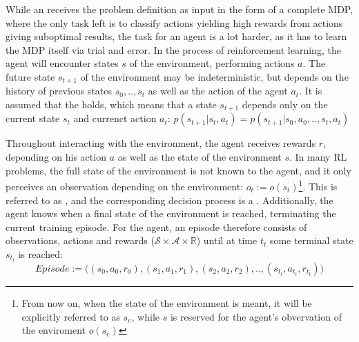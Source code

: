 \noindent While an  receives the problem definition as input in the form of a complete MDP, where the only task left is to classify actions yielding high rewards from actions giving suboptimal results, the task for an  agent is a lot harder, as it has to learn the MDP itself via trial and error. In the process of reinforcement learning, the agent will encounter states $s$ of the environment, performing actions $a$. The future state $s_{t+1}$ of the environment may be indeterministic, but depends on the history of previous states $s_0, .., s_t$ as well as the action of the agent $a_t$. It is assumed that the  holds, which means that a state  $s_{t+1}$ depends only on the current state $s_t$ and currenct action $a_t$: $p(s_{t+1}|s_t,a_t) = p(s_{t+1}|s_0,a_0,..,s_t,a_t)$

Throughout interacting with the environment, the agent receives rewards $r$, depending on his action $a$ as well as the state of the environment $s$. In many RL problems, the full state of the environment is not known to the agent, and it only perceives an observation depending on the environment: $o_t := o(s_t)$\footnote{From now on, when the state of the environment is meant, it will be explicitly referred to as $s_e$, while $s$ is reserved for the agent's obvervation of the enviroment $o(s_e)$}. This is referred to as , and the corresponding decision process is a . Additionally, the agent knows when a final state of the environment is reached, terminating the current training episode. For the agent, an episode therefore consists of observations, actions and rewards ($\mathcal{S} \times \mathcal{A} \times \mathds{R}$) until at time $t_t$ some terminal state $s_{t_t}$ is reached: $$Episode := \big((s_0, a_0, r_0), (s_1, a_1, r_1), (s_2,a_2,r_2), .., (s_{t_t}, a_{t_t}, r_{t_t})\big)$$

